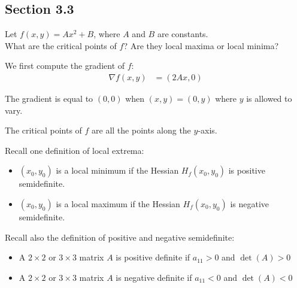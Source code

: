 \subsection{Section 3.3}

\begin{tcolorbox}[
        title={Problem 24},
        valign=center,
        nobeforeafter,
        colframe=gray!95!black
    ]
Let \(f(x, y) = Ax^2 + B\), where \(A\) and \(B\) are constants. \\

What are the critical points of \(f\)? Are they local maxima or local minima?
\end{tcolorbox}

\begin{solution}
    We first compute the gradient of \(f\):
    \begin{align}
        \nabla f(x, y) &= \left(2Ax, 0\right)
    \end{align}
    
    The gradient is equal to \((0, 0)\) when \((x, y) = (0, y)\) where \(y\) is allowed to vary.
    
    The critical points of \(f\) are all the points along the \(y\)-axis.
    
    Recall one definition of local extrema:
    \begin{itemize}
        \item \((x_0, y_0)\) is a local minimum if the Hessian \(H_f(x_0, y_0)\) is positive semidefinite.
        \item \((x_0, y_0)\) is a local maximum if the Hessian \(H_f(x_0, y_0)\) is negative semidefinite.
    \end{itemize}
    
    Recall also the definition of positive and negative semidefinite:
    \begin{itemize}
        \item A \(2 \times 2\) or \(3 \times 3\) matrix \(A\) is positive definite if \(a_{11} > 0\) and \(\det(A) > 0\)
        \item A \(2 \times 2\) or \(3 \times 3\) matrix \(A\) is negative definite if \(a_{11} < 0\) and \(\det(A) < 0\)
    \end{itemize}
    

\end{solution}
